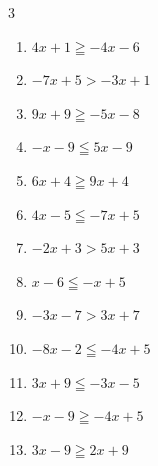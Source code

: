 \begin{multicols}{3}
\begin{enumerate}
  \item $4x+1\geqq -4x-6$


  \item $-7x+5>-3x+1$

        \phantom{$\displaystyle x<1$}

  \item $9x+9\geqq -5x-8$


  \item $-x-9\leqq 5x-9$

        \phantom{$\displaystyle x\geqq 0$}

  \item $6x+4\geqq 9x+4$

        \phantom{$\displaystyle x\leqq 0$}

  \item $4x-5\leqq -7x+5$


  \item $-2x+3>5x+3$

        \phantom{$\displaystyle x<0$}

  \item $x-6\leqq -x+5$


  \item $-3x-7>3x+7$


  \item $-8x-2\leqq -4x+5$


\columnbreak %

  \item $3x+9\leqq -3x-5$


  \item $-x-9\geqq -4x+5$


  \item $3x-9\geqq 2x+9$

        \phantom{$\displaystyle x\geqq 18$}


\end{enumerate}
\end{multicols}
